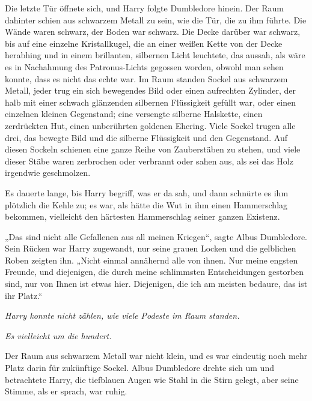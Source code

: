 {Die letzte Tür öffnete sich, und Harry folgte Dumbledore hinein. Der Raum dahinter schien aus schwarzem Metall zu sein, wie die Tür, die zu ihm führte. Die Wände waren schwarz, der Boden war schwarz. Die Decke darüber war schwarz, bis auf eine einzelne Kristallkugel, die an einer weißen Kette von der Decke herabhing und in einem brillanten, silbernen Licht leuchtete, das aussah, als wäre es in Nachahmung des Patronus-Lichts gegossen worden, obwohl man sehen konnte, dass es nicht das echte war. Im Raum standen Sockel aus schwarzem Metall, jeder trug ein sich bewegendes Bild oder einen aufrechten Zylinder, der halb mit einer schwach glänzenden silbernen Flüssigkeit gefüllt war, oder einen einzelnen kleinen Gegenstand; eine versengte silberne Halskette, einen zerdrückten Hut, einen unberührten goldenen Ehering. Viele Sockel trugen alle drei, das bewegte Bild und die silberne Flüssigkeit und den Gegenstand. Auf diesen Sockeln schienen eine ganze Reihe von Zauberstäben zu stehen, und viele dieser Stäbe waren zerbrochen oder verbrannt oder sahen aus, als sei das Holz irgendwie geschmolzen.

Es dauerte lange, bis Harry begriff, was er da sah, und dann schnürte es ihm plötzlich die Kehle zu; es war, als hätte die Wut in ihm einen Hammerschlag bekommen, vielleicht den härtesten Hammerschlag seiner ganzen Existenz.

„Das sind nicht alle Gefallenen aus all meinen Kriegen“, sagte Albus Dumbledore. Sein Rücken war Harry zugewandt, nur seine grauen Locken und die gelblichen Roben zeigten ihn. „Nicht einmal annähernd alle von ihnen. Nur meine engsten Freunde, und diejenigen, die durch meine schlimmsten Entscheidungen gestorben sind, nur von Ihnen ist etwas hier. Diejenigen, die ich am meisten bedaure, das ist ihr Platz.“

\emph{Harry konnte nicht zählen, wie viele Podeste im Raum standen.}

\hfill\break

\emph{Es vielleicht um die hundert.}

Der Raum aus schwarzem Metall war nicht klein, und es war eindeutig noch mehr Platz darin für zukünftige Sockel. Albus Dumbledore drehte sich um und betrachtete Harry, die tiefblauen Augen wie Stahl in die Stirn gelegt, aber seine Stimme, als er sprach, war ruhig.

}

